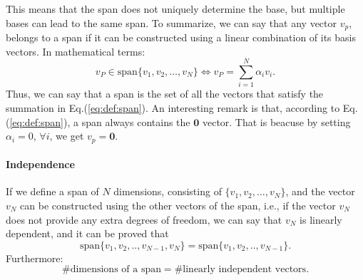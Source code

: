 This means that the span does not uniquely determine the base, but multiple bases can lead to the same span.\newline
To summarize, we can say that any vector $v_p$, belongs to a span if it can be constructed using a linear combination of its basis vectors. In mathematical terms:
\begin{equation}
    v_P \in \text{span}\{v_1,v_2, \hdots, v_N\} \iff v_P = \sum_{i=1}^N \alpha_i v_i.
\end{equation}\label{eq:def:span}
Thus, we can say that a span is the set of all the vectors that satisfy the summation in Eq.(\ref{eq:def:span}).\newline
An interesting remark is that, according to Eq.(\ref{eq:def:span}), a span always contains the $\mathbf{0}$ vector. That is beacuse by setting $\alpha_i = 0$, $\forall i$, we get $v_p=\mathbf{0}$. 

\paragraph{Independence}
If we define a span of $N$ dimensions, consisting of  $\{v_1,v_2, \hdots,v_{N}\}$, and the vector $v_N$ can be constructed using the other vectors of the span, i.e., if the vector $v_N$ does not provide any extra degrees of freedom, we can say that $v_N$ is linearly dependent, and it can be proved that
\begin{equation*}
    \text{span}\{v_1,v_2,..,v_{N-1}, v_{N}\} = \text{span}\{v_1,v_2,..,v_{N-1}\}.
\end{equation*}
Furthermore:
\begin{equation*}
    \#\text{dimensions of a span} = \#\text{linearly independent vectors}.
\end{equation*}

